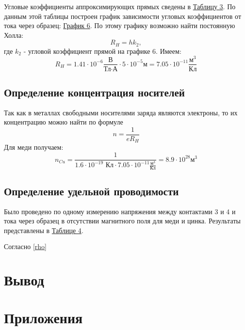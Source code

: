 \documentclass[15pt,a5paper,reqno]{article}
\begin{document}
        Угловые коэффициенты аппроксимирующих прямых сведены в \hyperlink{table_3}{Таблицу 3}. По данным этой таблицы построен график зависимости угловых коэффициентов от тока через образец: \hyperlink{graph_6}{График 6}. По этому графику возможно найти постоянную Холла:
        \begin{equation*}
            R_H = hk_2,
        \end{equation*}
        где $k_2$ - угловой коэффициент прямой на графике 6.
        Имеем:
        \begin{equation*}
            R_H = 1.41\cdot 10^{-6}\frac{\text{В}}{\text{Тл}\cdot\text{А}} \cdot 5 \cdot 10^{-5} м = 7.05 \cdot 10^{-11}\frac{\text{м}^3}{\text{Кл}}
        \end{equation*}

    \subsection{Определение концентрация носителей}

        Так как в металлах свободными носителями заряда являются электроны, то их концентрацию можно найти по формуле
        \begin{equation*}
            n = \frac{1}{eR_H}
        \end{equation*}
        Для меди получаем:
        \begin{equation*}
            n_{Cu} = \frac{1}{1.6 \cdot 10^{-19}\text{ Кл}\cdot 7.05 \cdot 10^{-11}\frac{\text{м}^3}{\text{Кл}}} = 8.9\cdot 10^{28}\text{м}^3
        \end{equation*}

    \subsection{Определение удельной проводимости}

        Было проведено по одному измерению напряжения между контактами 3 и 4 и тока через образец в отсутствии магнитного поля для меди и цинка. Результаты представлены в \hyperlink{table_4}{Таблице 4}.
        
        Согласно \eqref{rho} 
    
\section{Вывод}

    
    
\newpage
\section{Приложения}
\end{document}
